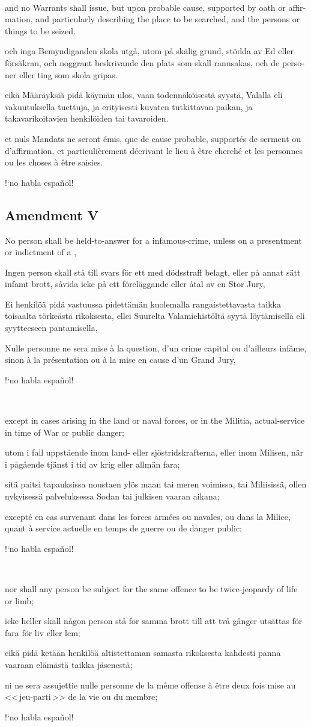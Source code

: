 \documentclass[a4paper,landscape,10pt]{article}
\newcommand{\tblock}[5]{\noindent\begin{minipage}[t]{0.18\textwidth}\foreignlanguage{english}{#1}\end{minipage}\hskip 0.025\textwidth\begin{minipage}[t]{0.18\textwidth}\foreignlanguage{swedish}{#2}\end{minipage}\hskip 0.025\textwidth\begin{minipage}[t]{0.18\textwidth}\foreignlanguage{finnish}{#3}\end{minipage}\hskip 0.025\textwidth\begin{minipage}[t]{0.18\textwidth}\foreignlanguage{french}{#4}\end{minipage}\hskip 0.025\textwidth\begin{minipage}[t]{0.18\textwidth}\foreignlanguage{spanish}{#5}\end{minipage}}
\begin{document}
~

\tblock
{and no Warrants shall issue, but upon probable cause, supported by \Gls{oath} or \gls{affirmation}, and particularly describing the place to be searched, and the persons or things to be seized.}
{och inga Bemyndiganden skola utgå, utom på skälig grund, stödda av Ed eller försäkran, och noggrant beskrivande den plats som skall rannsakas, och de personer eller ting som skola gripas.}
{eikä Määräyksiä pidä käymän ulos, vaan todennäköisestä syystä, Valalla eli vakuutuksella tuettuja, ja erityisesti kuvaten tutkittavan paikan, ja takavarikoitavien henkilöiden tai tavaroiden.}
{et nuls Mandats ne seront émis, que de cause probable, supportés de serment ou d'affirmation, et particulièrement décrivant le lieu à être cherché et les personnes ou les choses à être saisies.}
{!`no habla español!}

\subsection*{Amendment V}
\tblock
{No person shall be \gls{held-to-answer} for a \gls{infamous-crime}, unless on a \gls{presentment} or \gls{indictment} of a \glslink{grand-jury}{Grand Jury},}
{Ingen person skall stå till svars för ett med dödsstraff belagt, eller på annat sätt infamt brott, såvida icke på ett föreläggande eller åtal av en Stor Jury,}
{Ei henkilöä pidä vastuussa pidettämän kuolemalla rangaistettavasta taikka toisaalta törkeästä rikoksesta, ellei Suurelta Valamiehistöltä syytä löytämisellä eli syytteeseen pantamisella,}
{Nulle personne ne sera mise à la question, d'un crime capital ou d'ailleurs infâme, sinon à la présentation ou à la mise en cause d'un Grand Jury,}
{!`no habla español!}

~

\tblock
{except in cases arising in the land or naval forces, or in the Militia, \gls{actual-service} in time of War or public danger;}
{utom i fall uppstående inom land- eller sjöstridskrafterna, eller inom Milisen, när i pågående tjänst i tid av krig eller allmän fara;}
{sitä paitsi tapauksissa noustaen ylös maan tai meren voimissa, tai Miliisissä, ollen nykyisessä palveluksessa Sodan tai julkisen vaaran aikana;}
{excepté en cas survenant dans les forces armées ou navales, ou dans la Milice, quant à service actuelle en temps de guerre ou de danger public;}
{!`no habla español!}

~

\tblock
{nor shall any person be subject for the same offence to be \gls{twice-jeopardy} of life or limb;}
{icke heller skall någon person stå för samma brott till att två gånger utsättas för fara för liv eller lem;}
{eikä pidä ketään henkilöä altistettaman samasta rikoksesta kahdesti panna vaaraan elämästä taikka jäsenestä;}
{ni ne sera assujettie nulle personne de la même offense à être deux fois mise au <<\,jeu-parti\,>> de la vie ou du membre;}
{!`no habla español!}
\end{document}
